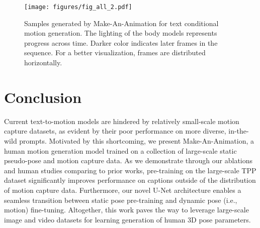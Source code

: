 \documentclass[10pt,twocolumn,letterpaper]{article}
\begin{document}
\begin{figure*}
  \centering \texttt{[image: figures/fig\_all\_2.pdf]}
  \caption{Samples generated by Make-An-Animation for text conditional motion generation. The lighting of the body models represents progress across time. Darker color indicates later frames in the sequence. For a better visualization, frames are distributed horizontally. }
  \label{fig:samples}
\end{figure*}



\section{Conclusion}
Current text-to-motion models are hindered by relatively small-scale motion capture datasets, as evident by their poor performance on more diverse, in-the-wild prompts. Motivated by this shortcoming, we present Make-An-Animation, a human motion generation model trained on a collection of large-scale static pseudo-pose and motion capture data. As we demonstrate through our ablations and human studies comparing to prior works, pre-training on the large-scale TPP dataset significantly improves performance on captions outside of the distribution of motion capture data. Furthermore, our novel U-Net architecture enables a seamless transition between static pose pre-training and dynamic pose (i.e., motion) fine-tuning. Altogether, this work paves the way to leverage large-scale image and video datasets for learning generation of human 3D pose parameters.



\newpage

{\small


}
\end{document}
